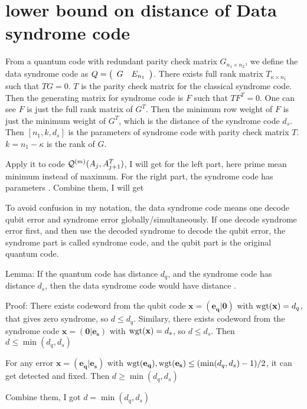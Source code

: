 \documentclass[aps,prb,12pt,tightenlines,%
notitlepage,longbibliography]{revtex4-1}
\begin{document}
\section{lower bound on distance of Data syndrome code}
From a quantum code with redundant parity check matrix $G_{n_1 \times n_2}$, we define the data syndrome code as $Q=\left( \begin{array}[c]{cc} G& E_{n_1} \end{array} \right)$. There exists full rank matrix $T_{\kappa \times n_1}$ such that $TG=0$. $T$ is the parity check matrix for the classical syndrome code. Then the generating matrix for syndrome code is $F$ such that $TF^T=0$. One can see $F$ is just the full rank matrix of $G^T$. Then the minimum row weight of $F$ is just the minimum weight of $G^T$, which is the distance of the syndrome code $d_s$. Then $[n_1,k,d_s]$ is the parameters of syndrome code with parity check matrix $T$. $k=n_1-\kappa$ is the rank of $G$.

Apply it to code $ {\cal Q}^{(m)}(A_{j},A_{j+1}^T)$, I will get  for the left part, here prime mean minimum instead of maximum. For the right part, the syndrome code has parameters  . Combine them, I will get  

To avoid confusion in my notation, the data syndrome code means one decode qubit error and syndrome error globally/simultaneously. If one decode syndrome error first, and then use the decoded syndrome to decode the qubit error,  the syndrome part is called syndrome code, and the qubit part is the original quantum code.

Lemma: If the quantum code has distance $d_q$, and the syndrome code has distance $d_s$, then the data syndrome code would have distance .

Proof: There exists codeword from the qubit code $\mathbf{x=(e_q | 0)}$ with $\mathop{\rm wgt} (\mathbf{x})=d_q$, that gives zero syndrome, so $d \leq d_q$. Similary, there exists codeword from the syndrome code $\mathbf{x=(0 | e_s)}$ with $\mathop{\rm wgt} (\mathbf{x})=d_s$, so $d \leq d_s$. Then $d\leq \min(d_q,d_s)$

For any error $\mathbf{x=(e_q | e_s)}$ with $\mathop{\rm wgt} (\mathbf{e_q}), \mathop{\rm wgt} (\mathbf{e_s}) \leq (\min(d_q,d_s)-1)/2$, it can get detected and fixed. Then $d\geq \min(d_q,d_s)$

Combine them, I got $d= \min(d_q,d_s)$





\end{document}
